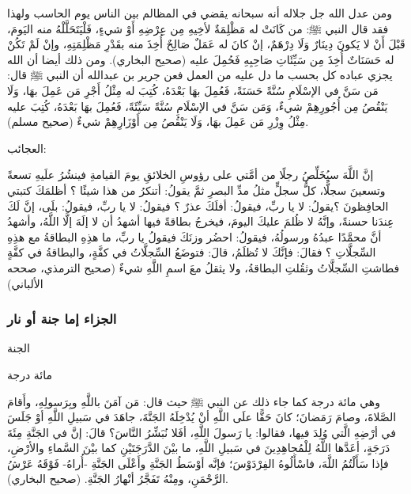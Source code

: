 ومن عدل الله جل جلاله أنه سبحانه يقضي في المظالم بين الناس يوم الحاسب ولهذا فقد قال النبي ﷺ:  من كَانَتْ له مَظْلِمَةٌ لأخِيهِ مِن عِرْضِهِ أَوْ شيءٍ، فَلْيَتَحَلَّلْهُ منه اليَومَ، قَبْلَ أَنْ لا يَكونَ دِينَارٌ وَلَا دِرْهَمٌ، إنْ كانَ له عَمَلٌ صَالِحٌ أُخِذَ منه بقَدْرِ مَظْلِمَتِهِ، وإنْ لَمْ تَكُنْ له حَسَنَاتٌ أُخِذَ مِن سَيِّئَاتِ صَاحِبِهِ فَحُمِلَ عليه {\footnotesize (صحيح البخاري)}. ومن ذلك أيضا أن الله يجزي عباده كل بحسب ما دل عليه من العمل فعن جرير بن عبدالله أن النبي ﷺ قال: مَن سَنَّ في الإسْلَامِ سُنَّةً حَسَنَةً، فَعُمِلَ بهَا بَعْدَهُ، كُتِبَ له مِثْلُ أَجْرِ مَن عَمِلَ بهَا، وَلَا يَنْقُصُ مِن أُجُورِهِمْ شيءٌ، وَمَن سَنَّ في الإسْلَامِ سُنَّةً سَيِّئَةً، فَعُمِلَ بهَا بَعْدَهُ، كُتِبَ عليه مِثْلُ وِزْرِ مَن عَمِلَ بهَا، وَلَا يَنْقُصُ مِن أَوْزَارِهِمْ شيءٌ {\footnotesize (صحيح مسلم)}.

العجائب: 

إنَّ اللَّهَ سيُخَلِّصُ رجلًا من أمَّتي على رؤوسِ الخلائقِ يومَ القيامةِ فينشُرُ علَيهِ تسعةً وتسعينَ سجلًّا، كلُّ سجلٍّ مثلُ مدِّ البصرِ ثمَّ يقولُ: أتنكرُ من هذا شيئًا ؟ أظلمَكَ كتبتي الحافِظونَ ؟يقولُ: لا يا ربِّ، فيقولُ: أفلَكَ عذرٌ ؟ فيقولُ: لا يا ربِّ، فيقولُ: بلَى، إنَّ لَكَ عِندَنا حسنةً، وإنَّهُ لا ظُلمَ عليكَ اليومَ، فيخرجُ بطاقةً فيها أشهدُ أن لا إلَهَ إلَّا اللَّهُ، وأشهدُ أنَّ محمَّدًا عبدُهُ ورسولُهُ، فيقولُ: احضُر وزنَكَ فيقولُ يا ربِّ، ما هذِهِ البطاقةُ مع هذِهِ السِّجلَّاتِ ؟ فقالَ: فإنَّكَ لا تُظلَمُ، قالَ: فتوضَعُ السِّجلَّاتُ في كفَّةٍ، والبطاقةُ في كفَّةٍ فطاشتِ السِّجلَّاتُ وثقُلتِ البطاقةُ، ولا يثقلُ معَ اسمِ اللَّهِ شيءٌ {\footnotesize (صحيح الترمذي، صححه الألباني)}


\subsubsection{الجزاء إما جنة أو نار}

الجنة 

مائة درجة 

وهي مائة درجة كما جاء ذلك عن النبي ﷺ حيث قال: مَن آمَنَ باللَّهِ وبِرَسولِهِ، وأَقامَ الصَّلاةَ، وصامَ رَمَضانَ؛ كانَ حَقًّا علَى اللَّهِ أنْ يُدْخِلَهُ الجَنَّةَ، جاهَدَ في سَبيلِ اللَّهِ أوْ جَلَسَ في أرْضِهِ الَّتي وُلِدَ فيها، فقالوا: يا رَسولَ اللَّهِ، أفَلا نُبَشِّرُ النَّاسَ؟ قالَ: إنَّ في الجَنَّةِ مِئَةَ دَرَجَةٍ، أعَدَّها اللَّهُ لِلْمُجاهِدِينَ في سَبيلِ اللَّهِ، ما بيْنَ الدَّرَجَتَيْنِ كما بيْنَ السَّماءِ والأرْضِ، فإذا سَأَلْتُمُ اللَّهَ، فاسْأَلُوهُ الفِرْدَوْسَ؛ فإنَّه أوْسَطُ الجَنَّةِ وأَعْلَى الجَنَّةِ -أُراهُ- فَوْقَهُ عَرْشُ الرَّحْمَنِ، ومِنْهُ تَفَجَّرُ أنْهارُ الجَنَّةِ. {\footnotesize (صحيح البخاري)}.

